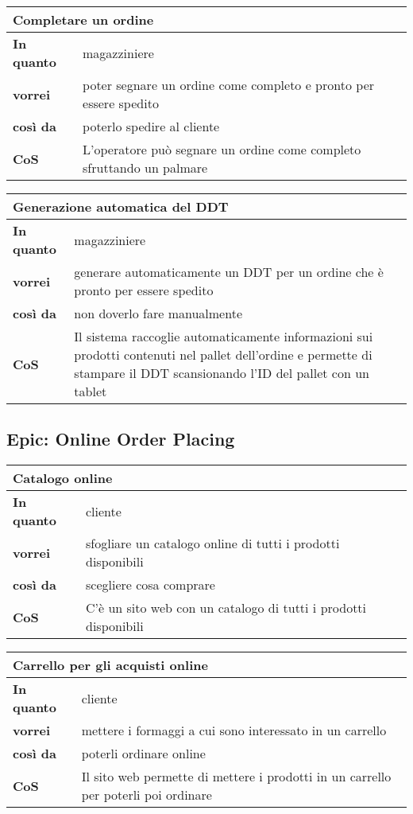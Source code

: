 \begin{tabularx}{\textwidth}{lX}
  \toprule
  \multicolumn{2}{l}{\textbf{Completare un ordine}} \\
  \midrule
  \textbf{In quanto} & magazziniere \\
  \textbf{vorrei} & poter segnare un ordine come completo e pronto per essere spedito \\
  \textbf{così da} & poterlo spedire al cliente \\
  \midrule
  \textbf{CoS} & L'operatore può segnare un ordine come completo sfruttando un palmare \\
  \bottomrule
\end{tabularx}

\begin{tabularx}{\textwidth}{lX}
  \toprule
  \multicolumn{2}{l}{\textbf{Generazione automatica del DDT}} \\
  \midrule
  \textbf{In quanto} & magazziniere \\
  \textbf{vorrei} & generare automaticamente un DDT per un ordine che è pronto per essere spedito \\
  \textbf{così da} & non doverlo fare manualmente \\
  \midrule
  \textbf{CoS} & Il sistema raccoglie automaticamente informazioni sui prodotti contenuti nel pallet dell'ordine e permette di stampare il DDT scansionando l'ID del pallet con un tablet \\
  \bottomrule
\end{tabularx}

\subsection{Epic: Online Order Placing}
\begin{tabularx}{\textwidth}{lX}
  \toprule
  \multicolumn{2}{l}{\textbf{Catalogo online}} \\
  \midrule
  \textbf{In quanto} & cliente \\
  \textbf{vorrei} & sfogliare un catalogo online di tutti i prodotti disponibili \\
  \textbf{così da} & scegliere cosa comprare \\
  \midrule
  \textbf{CoS} & C'è un sito web con un catalogo di tutti i prodotti disponibili \\
  \bottomrule
\end{tabularx}

\begin{tabularx}{\textwidth}{lX}
  \toprule
  \multicolumn{2}{l}{\textbf{Carrello per gli acquisti online}} \\
  \midrule
  \textbf{In quanto} & cliente \\
  \textbf{vorrei} & mettere i formaggi a cui sono interessato in un carrello \\
  \textbf{così da} & poterli ordinare online \\
  \midrule
  \textbf{CoS} & Il sito web permette di mettere i prodotti in un carrello per poterli poi ordinare \\
  \bottomrule
\end{tabularx}

